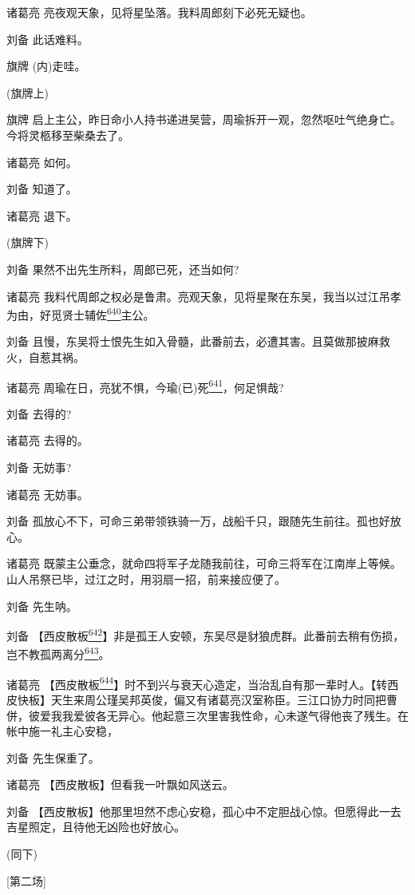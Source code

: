 诸葛亮 亮夜观天象，见将星坠落。我料周郎刻下必死无疑也。

刘备 此话难料。

旗牌 (内)走哇。

(旗牌上)

旗牌
启上主公，昨日命小人持书递进吴营，周瑜拆开一观，忽然呕吐气绝身亡。今将灵柩移至柴桑去了。

诸葛亮 如何。

刘备 知道了。

诸葛亮 退下。

(旗牌下)

刘备 果然不出先生所料，周郎已死，还当如何?

诸葛亮
我料代周郎之权必是鲁肃。亮观天象，见将星聚在东吴，我当以过江吊孝为由，好觅贤士辅佐\protect\hyperlink{fn640}{\textsuperscript{640}}主公。

刘备
且慢，东吴将士恨先生如入骨髓，此番前去，必遭其害。且莫做那披麻救火，自惹其祸。

诸葛亮
周瑜在日，亮犹不惧，今瑜(已)死\protect\hyperlink{fn641}{\textsuperscript{641}}，何足惧哉?

刘备 去得的?

诸葛亮 去得的。

刘备 无妨事?

诸葛亮 无妨事。

刘备
孤放心不下，可命三弟带领铁骑一万，战船千只，跟随先生前往。孤也好放心。

诸葛亮
既蒙主公垂念，就命四将军子龙随我前往，可命三将军在江南岸上等候。山人吊祭已毕，过江之时，用羽扇一招，前来接应便了。

刘备 先生呐。

刘备
【西皮散板\protect\hyperlink{fn642}{\textsuperscript{642}}】非是孤王人安顿，东吴尽是豺狼虎群。此番前去稍有伤损，岂不教孤两离分\protect\hyperlink{fn643}{\textsuperscript{643}}。

诸葛亮
【西皮散板\protect\hyperlink{fn644}{\textsuperscript{644}}】时不到兴与衰天心造定，当治乱自有那一辈时人。【转西皮快板】天生来周公瑾吴邦英俊，偏又有诸葛亮汉室称臣。三江口协力时同把曹併，彼爱我我爱彼各无异心。他起意三次里害我性命，心未遂气得他丧了残生。在帐中施一礼主心安稳，

刘备 先生保重了。

诸葛亮 【西皮散板】但看我一叶飘如风送云。

刘备
【西皮散板】他那里坦然不虑心安稳，孤心中不定胆战心惊。但愿得此一去吉星照定，且待他无凶险也好放心。

(同下)

{[}第二场{]}

